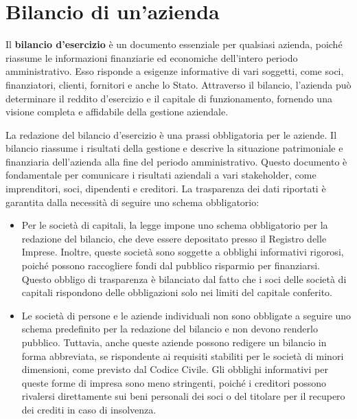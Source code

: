 \chapter{Bilancio di un'azienda}
\begin{redbar}
Il \textbf{bilancio d’esercizio} è un documento essenziale per qualsiasi azienda, poiché riassume le informazioni finanziarie ed economiche dell’intero periodo amministrativo. Esso risponde a esigenze informative di vari soggetti, come soci, finanziatori, clienti, fornitori e anche lo Stato. Attraverso il bilancio, l’azienda può determinare il reddito d’esercizio e il capitale di funzionamento, fornendo una visione completa e affidabile della gestione aziendale.    
\end{redbar}

La redazione del bilancio d’esercizio è una prassi obbligatoria per le aziende. Il bilancio riassume i risultati della gestione e descrive la situazione patrimoniale e finanziaria dell’azienda alla fine del periodo amministrativo. Questo documento è fondamentale per comunicare i risultati aziendali a vari stakeholder, come imprenditori, soci, dipendenti e creditori. La trasparenza dei dati riportati è garantita dalla necessità di seguire uno schema obbligatorio:
\begin{itemize}
    \item Per le società di capitali, la legge impone uno schema obbligatorio per la redazione del bilancio, che deve essere depositato presso il Registro delle Imprese. Inoltre, queste società sono soggette a obblighi informativi rigorosi, poiché possono raccogliere fondi dal pubblico risparmio per finanziarsi. Questo obbligo di trasparenza è bilanciato dal fatto che i soci delle società di capitali rispondono delle obbligazioni solo nei limiti del capitale conferito.
    \item Le società di persone e le aziende individuali non sono obbligate a seguire uno schema predefinito per la redazione del bilancio e non devono renderlo pubblico. Tuttavia, anche queste aziende possono redigere un bilancio in forma abbreviata, se rispondente ai requisiti stabiliti per le società di minori dimensioni, come previsto dal Codice Civile. Gli obblighi informativi per queste forme di impresa sono meno stringenti, poiché i creditori possono rivalersi direttamente sui beni personali dei soci o del titolare per il recupero dei crediti in caso di insolvenza.
\end{itemize}

